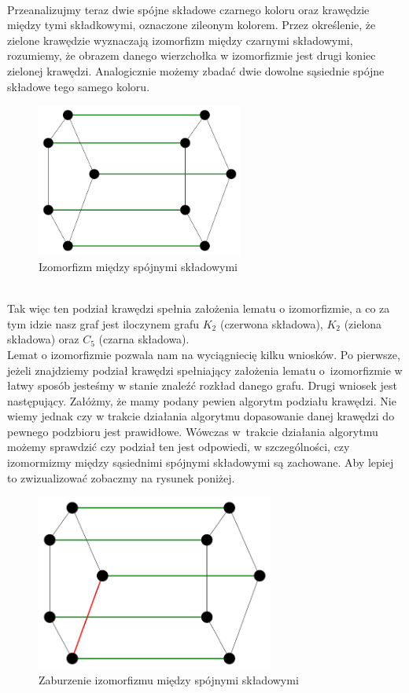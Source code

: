 \documentclass[12pt,a4paper,titlepage]{article}
\newcommand\tab[1][1cm]{\hspace*{#1}}
\begin{document}
\\
\tab[0.6cm]Przeanalizujmy teraz dwie spójne składowe czarnego koloru oraz krawędzie między tymi składkowymi, oznaczone zileonym kolorem. Przez określenie, że zielone krawędzie wyznaczają izomorfizm między czarnymi składowymi, rozumiemy, że obrazem danego wierzchołka w izomorfizmie jest drugi  koniec zielonej krawędzi. Analogicznie możemy zbadać dwie dowolne sąsiednie spójne składowe tego samego koloru.
\begin{figure}[h]
\centering
\includegraphics[width = 6.8cm]{izom2.png}
\caption{Izomorfizm między spójnymi składowymi}
\end{figure}
\\
\tab[0.6cm]Tak więc ten podział krawędzi spełnia założenia lematu o izomorfizmie, a co za tym idzie nasz graf jest iloczynem grafu $K_2$ (czerwona składowa), $K_2$ (zielona składowa) oraz $C_5$ (czarna składowa). \\
\tab[0.6cm]Lemat o izomorfizmie pozwala nam na wyciągniecię kilku wniosków. Po pierwsze, jeżeli znajdziemy podział krawędzi spełniający założenia lematu o~izomorfizmie w łatwy sposób jesteśmy w stanie znaleźć rozkład danego grafu. Drugi wniosek jest następujący. Załóżmy, że mamy podany pewien algorytm podziału krawędzi. Nie wiemy jednak czy w trakcie działania algorytmu dopasowanie danej krawędzi do pewnego podzbioru jest prawidłowe. Wówczas w~trakcie działania algorytmu możemy sprawdzić czy podział ten jest odpowiedi, w szczególności, czy izomormizmy między sąsiednimi spójnymi składowymi są zachowane. Aby lepiej to zwizualizować zobaczmy na rysunek poniżej.
\begin{figure}[h]
\centering
\includegraphics[width = 7.8cm]{izom3.png}
\caption{Zaburzenie izomorfizmu między spójnymi składowymi}
\end{figure}
\end{document}
